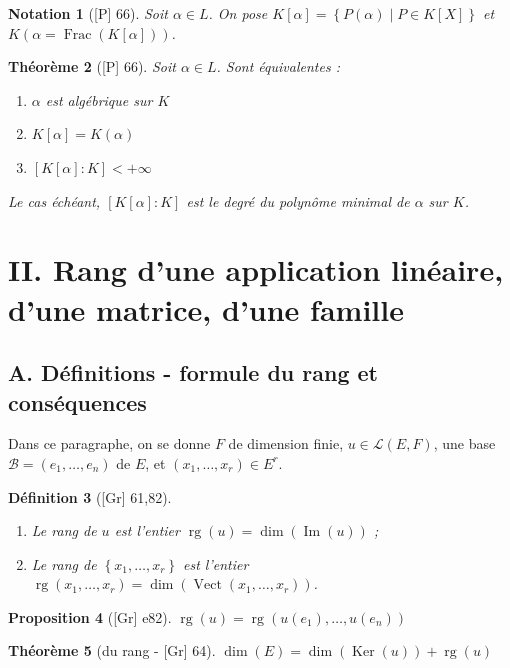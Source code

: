 \documentclass[10pt, a4paper, parskip=full, twoside, twocolumn]{report}
\newtheorem{definition}{Définition}
\newtheorem{theorem}[definition]{Théorème}
\newtheorem{proposition}[definition]{Proposition}
\newtheorem{notation}[definition]{Notation}
\DeclareMathOperator{\im}{Im}
\DeclareMathOperator{\rg}{rg}
\DeclareMathOperator{\Ker}{Ker}
\DeclareMathOperator{\Frac}{Frac}
\DeclareMathOperator{\Vect}{Vect}
\begin{document}
\begin{notation}[\textnormal{[P] 66}]
	Soit $\alpha \in L$. On pose $K[\alpha] = \left\{P(\alpha)\mid P\in K[X]\right\}$
	et $K(\alpha = \Frac(K[\alpha]))$.
\end{notation}

\begin{theorem}[\textnormal{[P] 66}]
	Soit $\alpha\in L$. Sont équivalentes :
	\begin{enumerate}
		\item $\alpha$ est algébrique sur $K$
		\item $K[\alpha] = K(\alpha)$
		\item $[K[\alpha] : K] < +\infty$
	\end{enumerate}

	Le cas échéant, $[K[\alpha] : K]$ est le degré du polynôme minimal de $\alpha$ sur $K$.
\end{theorem}

\section*{II. Rang d'une application linéaire, d'une matrice, d'une famille}
\subsection*{A. Définitions - formule du rang et conséquences}

\textcolor{paragraphtext}{Dans ce paragraphe, on se donne $F$ de dimension finie, $u\in\mathcal{L}(E,F)$, une
base $\mathcal{B}=(e_1,\dots, e_n)$ de $E$, et $(x_1,\dots, x_r)\in E^r$.}

\begin{definition}[\textnormal{[Gr] 61,82}]
		\begin{enumerate}
			\item Le \emph{rang de $u$} est l'entier $\rg(u)=\dim(\im(u))$ ;
			\item Le \emph{rang de $\left\{x_1,\dots,x_r\right\}$} est l'entier $\rg(x_1,\dots, x_r) = \dim(\Vect(x_1,\dots, x_r))$.
		\end{enumerate}
\end{definition}

\begin{proposition}[\textnormal{[Gr] e82}]
	$\rg(u) = \rg(u(e_1),\dots, u(e_n))$
\end{proposition}

\begin{theorem}[du rang - \textnormal{[Gr] 64}]
	$\dim(E) = \dim(\Ker(u)) + \rg(u)$
\end{theorem}
\end{document}
